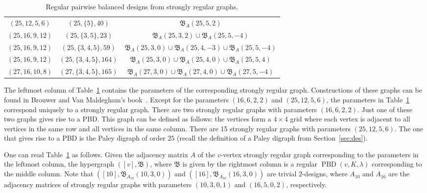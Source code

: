 \documentclass[11pt]{article}
\begin{document}
\begin{table}[htb]
\begin{tabular}{c|c|c}
        $(25,12,5,6)$  & $(25,\{5\},40)$ & $\mathfrak B_A(25,5,2)$ \\
        $(25,16,9,12)$ & $(25,\{3,5\},23)$ & $\mathfrak B_A(25,3,2)\cup \mathfrak B_A(25,5,-4)$ \\
        $(25,16,9,12)$ & $(25,\{3,4,5\},59)$ & $\mathfrak B_A(25,3,0)\cup \mathfrak B_A(25,4,-3)\cup \mathfrak B_A(25,5,-4)$ \\
        $(25,16,9,12)$ & $(25,\{3,4,5\},164)$ & $\mathfrak B_A(25,3,0)\cup \mathfrak B_A(25,4,0)\cup \mathfrak B_A(25,5,4)$  \\
        $(27,16,10,8)$ & $(27,\{3,4,5\},165)$ & $\mathfrak B_A(27,3,0)\cup \mathfrak B_A(27,4,0)\cup \mathfrak B_A(27,5,-4)$ \\
    \end{tabular}
    \caption{Regular pairwise balanced designs from strongly regular graphs.}
    \label{tab:my_label}
\end{table}
The leftmost column of Table~\ref{tab:my_label} contains the parameters of the corresponding strongly regular graph.
Constructions of these graphs can be found in Brouwer and Van Maldegham's book~\cite{SRG}.
Except for the parameters $(16,6,2,2)$ and $(25,12,5,6)$, the parameters in Table~\ref{tab:my_label} correspond uniquely to a strongly regular graph.
There are two strongly regular graphs with parameters $(16,6,2,2)$.
Just one of these two graphs gives rise to a PBD.
This graph can be defined as follows: the vertices form a $4 \times 4$ grid where each vertex is adjacent to all vertices in the same row and all vertices in the same column.
There are 15 strongly regular graphs with parameters $(25,12,5,6)$.
The one that gives rise to a PBD is the Paley digraph of order $25$ (recall the definition of a Paley digraph from Section~\ref{sec:des}).

One can read Table~\ref{tab:my_label} as follows.
Given the adjacency matrix $A$ of the $v$-vertex strongly regular graph corresponding to the parameters in the leftmost column, the hypergraph $([v],\mathfrak B)$, where $\mathfrak B$ is given by the rightmost column is a regular $\operatorname{PBD}(v,K,\lambda)$ corresponding to the middle column.
Note that $([10],\mathfrak B_{A_{10}}(10,3,0))$ and $([16],\mathfrak B_{A_{16}}(16,3,0))$ are trivial $2$-designs, where $A_{10}$ and $A_{16}$ are the adjacency matrices of strongly regular graphs with parameters $(10,3,0,1)$ and $(16,5,0,2)$, respectively.

\end{document}
